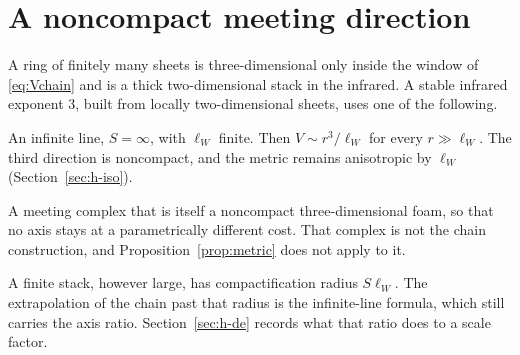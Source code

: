 \section{A noncompact meeting direction}
\label{sec:h-macro}

A ring of finitely many sheets is three-dimensional only inside the window
of \eqref{eq:Vchain} and is a thick two-dimensional stack in the infrared.
A stable infrared exponent \(3\), built from locally two-dimensional
sheets, uses one of the following.

An infinite line, \(S=\infty\), with \(\ell_W\) finite.
Then \(V\sim r^3/\ell_W\) for every \(r\gg\ell_W\).
The third direction is noncompact, and the metric remains anisotropic by
\(\ell_W\) (Section~\ref{sec:h-iso}).

A meeting complex that is itself a noncompact three-dimensional foam, so
that no axis stays at a parametrically different cost.
That complex is not the chain construction, and
Proposition~\ref{prop:metric} does not apply to it.

A finite stack, however large, has compactification radius \(S\ell_W\).
The extrapolation of the chain past that radius is the infinite-line
formula, which still carries the axis ratio.
Section~\ref{sec:h-de} records what that ratio does to a scale factor.
